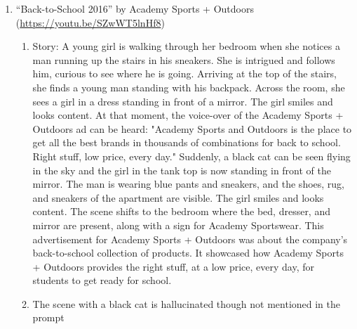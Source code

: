\documentclass[hidelinks,11pt,a4paper]{report}
\begin{document}
\begin{enumerate}
    \item ``Back-to-School 2016'' by Academy Sports + Outdoors (\url{https://youtu.be/SZwWT5lnHf8}) 
    \begin{enumerate}
        \item Story: A young girl is walking through her bedroom when she notices a man running up the stairs in his sneakers. She is intrigued and follows him, curious to see where he is going. Arriving at the top of the stairs, she finds a young man standing with his backpack. Across the room, she sees a girl in a dress standing in front of a mirror. The girl smiles and looks content. At that moment, the voice-over of the Academy Sports + Outdoors ad can be heard: "Academy Sports and Outdoors is the place to get all the best brands in thousands of combinations for back to school. Right stuff, low price, every day." Suddenly, a black cat can be seen flying in the sky and the girl in the tank top is now standing in front of the mirror. The man is wearing blue pants and sneakers, and the shoes, rug, and sneakers of the apartment are visible. The girl smiles and looks content. The scene shifts to the bedroom where the bed, dresser, and mirror are present, along with a sign for Academy Sportswear. This advertisement for Academy Sports + Outdoors was about the company's back-to-school collection of products. It showcased how Academy Sports + Outdoors provides the right stuff, at a low price, every day, for students to get ready for school.

        \item The scene with a black cat is hallucinated though not mentioned in the prompt

    \end{enumerate}
    

\end{enumerate}
\end{document}
